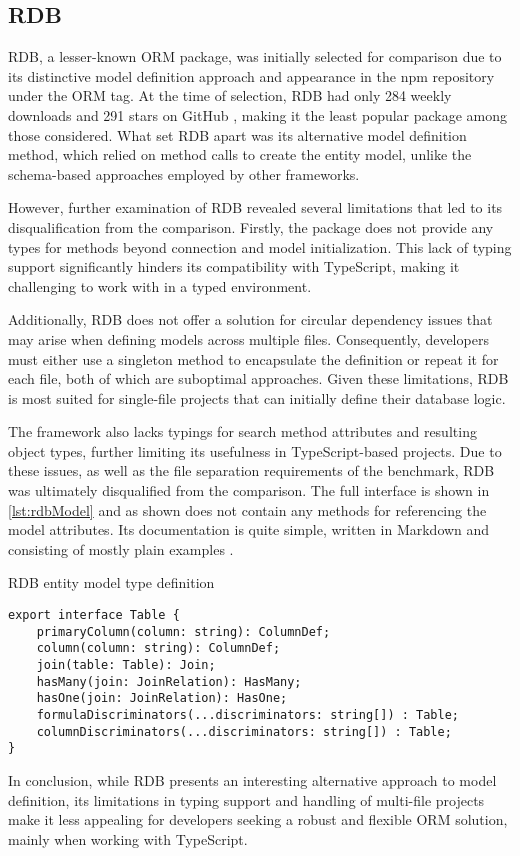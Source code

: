 \subsection{RDB}

RDB, a lesser-known ORM package, was initially selected for comparison due to
its distinctive model definition approach and appearance in the npm repository
under the ORM tag. At the time of selection, RDB had only 284 weekly downloads
\cite{rdbNpm} and 291 stars on GitHub \cite{rdbGitHub}, making it the least
popular package among those considered. What set RDB apart was its alternative
model definition method, which relied on method calls to create the entity
model, unlike the schema-based approaches employed by other frameworks.

However, further examination of RDB revealed several limitations that led to its
disqualification from the comparison. Firstly, the package does not provide any
types for methods beyond connection and model initialization. This lack of
typing support significantly hinders its compatibility with TypeScript, making
it challenging to work with in a typed environment.

Additionally, RDB does not offer a solution for circular dependency issues that
may arise when defining models across multiple files. Consequently, developers
must either use a singleton method to encapsulate the definition or repeat it
for each file, both of which are suboptimal approaches. Given these limitations,
RDB is most suited for single-file projects that can initially define their
database logic.

The framework also lacks typings for search method attributes and resulting
object types, further limiting its usefulness in TypeScript-based projects. Due
to these issues, as well as the file separation requirements of the benchmark,
RDB was ultimately disqualified from the comparison. The full interface is shown
in \autoref{lst:rdbModel} and as shown does not contain any methods for
referencing the model attributes. Its documentation is quite simple, written in
Markdown and consisting of mostly plain examples \cite{rdbDocs}.

\begin{listing}
\caption{RDB entity model type definition}
\label{lst:rdbModel}
\begin{verbatim}
export interface Table {
    primaryColumn(column: string): ColumnDef;
    column(column: string): ColumnDef;
    join(table: Table): Join;
    hasMany(join: JoinRelation): HasMany;
    hasOne(join: JoinRelation): HasOne;
    formulaDiscriminators(...discriminators: string[]) : Table;
    columnDiscriminators(...discriminators: string[]) : Table;
}
\end{verbatim}
\end{listing}

In conclusion, while RDB presents an interesting alternative approach to model
definition, its limitations in typing support and handling of multi-file
projects make it less appealing for developers seeking a robust and flexible ORM
solution, mainly when working with TypeScript.